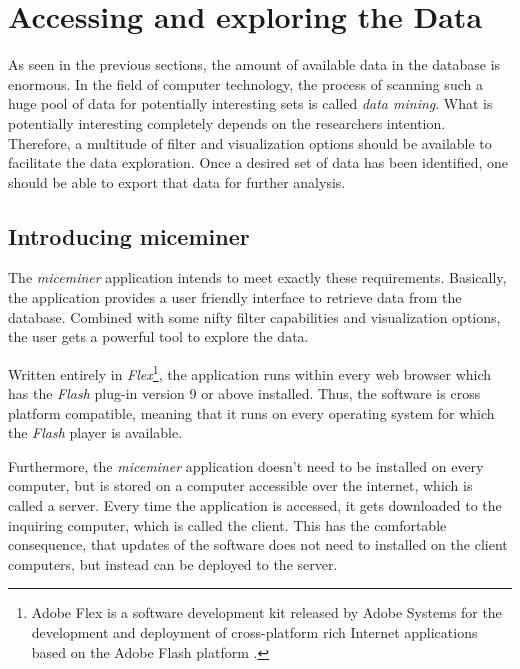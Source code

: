 \newpage
\section{Accessing and exploring the Data }
\label{sec:dataaccessandexp}

As seen in the previous sections, the amount of available data in the database is enormous. In the field of computer technology, the process of scanning such a huge pool of data for potentially interesting sets is called \textit{data mining}. What is potentially interesting completely depends on the researchers intention. Therefore, a multitude of filter and visualization options should be available to facilitate the data exploration. Once a desired set of data has been identified, one should be able to export that data for further analysis. 

\subsection{Introducing miceminer}
\label{subsec:dataexp}

The \textit{miceminer} application intends to meet exactly these requirements. Basically, the application provides a user friendly interface to retrieve data from the database. Combined with some nifty filter capabilities and visualization options, the user gets a powerful tool to explore the data.

Written entirely in \textit{Flex}\footnote{Adobe Flex is a software development kit released by Adobe Systems for the development and deployment of cross-platform rich Internet applications based on the Adobe Flash platform \cite{wiki:flex}.}, the application runs within every web browser which has the \textit{Flash} plug-in version 9 or above installed. Thus, the software is cross platform compatible, meaning that it runs on every operating system for which the \textit{Flash} player is available. 

Furthermore, the \textit{miceminer} application doesn't need to be installed on every computer, but is stored on a computer accessible over the internet, which is called a server. Every time the application is accessed, it gets downloaded to the inquiring computer, which is called the client. This has the comfortable consequence, that updates of the software does not need to installed on the client computers, but instead can be deployed to the server.     

